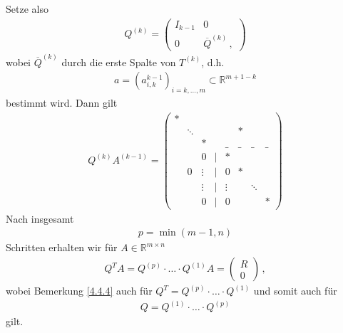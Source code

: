 \documentclass[ngerman,fontsize=11pt, paper=a4, parskip=half, titlepage=true, toc=bib]{scrbook}
\newcommand{\R}{\mathds{R}}
\begin{document}
  Setze also
  \begin{gather}
    Q^{(k)} = \begin{pmatrix}
      I_{k-1} & 0 \\
      0 & \overline{Q}^{(k)} \, ,
      \label{IV.4.13}
    \end{pmatrix}
  \end{gather}
  wobei $\overline{Q}^{(k)} $ durch die erste Spalte von $T^{(k)}$, d.h.
  \begin{gather}
    a= (a_{i,k}^{k-1})_{i=k,\dotsc, m} \subset \R^{m+1-k}
    \label{IV.4.14}
  \end{gather}
  bestimmt wird. Dann gilt
  \begin{gather*}
    Q^{(k)}A^{(k-1)} =
    \begin{pmatrix}
      *  &&&&&\\
      &\ddots &&&& * \\
      &&*&&\_&\_&\_&\_ \\
      &&0&|&* \\
      &0&\vdots&|&0&* \\
      &&\vdots&  |&\vdots &&\ddots\\
      &&0&  |&0&&&*
    \end{pmatrix}
  \end{gather*}
  Nach insgesamt 
  \begin{gather}
    p=\min (m-1, n)
    \label{IV.4.15}
  \end{gather}
  Schritten erhalten wir für $A\in \R^{m\times n}$
  \begin{gather}
    Q^TA = Q^{(p)}\cdot \dotsc \cdot Q^{(1)}A 
    = \begin{pmatrix} R\\0\end{pmatrix}\, ,
  \end{gather}
  wobei Bemerkung \ref{4.4.4} auch für 
  $Q^T= Q^{(p)}\cdot \dotsc \cdot Q^{(1)} $ und somit auch für
  \begin{gather}
    Q = Q^{(1)}\cdot \dotsc \cdot Q^{(p)}
    \label{IV.4.16}
  \end{gather}
  gilt.
  
  
  
\end{document}
